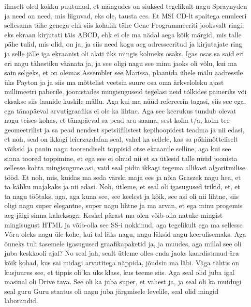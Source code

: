 ilmselt oled kokku puutunud, et mängudes on siuksed tegelikult nagu Spraynyden ja need on need, mis liiguvad, eks ole, tausta ees. Et MSI CD-lt spaitega emuleeri sellesama tähe genega ehk siis kohalik tähe Gene Programmeeriti jooksvalt ringi, eks ekraan kirjutati täis ABCD, ehk ei ole ma nädal aega kõik märgid, mis talle pähe tulid, mis olid, on ja, ja siis need kogu aeg adresseeritud ja kirjutajate ring ja selle jälle iga ekraanist oli alati üks mingis kolmeks osaks. Igas osas sa said eri eri nagu tähestiku väänata ja, ja see oligi nagu see minu jaoks oli võlu, kui ma sain selgeks, et on olemas Assembler see Marissa, plaanida ühele mälu aadressile üks Payton ja ja siis ma mõttelist veetsin suure osa oma ärkveloleku ajast millimeetri paberile, joonistades mingisuguseid tegelasi neid tõlkides paineriks või eksakse siis laanide kuskile mällu. Aga kui ma nüüd refereerin tagasi, siis see ega, ega tänapäeval arvutigraafika ei ole ka lihtne. Aga see keerukus tundub olevat nagu teises kohas, et tänapäeval sa pead aru saama, sest kolm t/a, kolm tee geomeetrilist ja sa pead nendest spetsiifilistest kepihoopidest teadma ja nii edasi, et noh, seal on ikkagi leierzazdafan seal, vahel ka sellele, kas sa põhimõtteliselt võiksid ja panin nagu toorendiselt toppisid otse ekraanile selline, aga kui see sinna toored toppimine, et ega see ei olnud nii et sa ütlesid talle nüüd joonista sellesse kohta mingisugune asi, vaid seal pidin ikkagi tegema allikast algoritmilise tööd. Et noh, mis, kuidas ma seda värski maja ees ja nõia Graszek nagu hea, et ta kähku majakaks ja nii edasi. Noh, ütleme, et seal oli igasugused trikid, et, et ta nagu töötaks, aga, aga kuna see, see keelest ja kõik, see asi oli nii lihtne, siis oligi nagu super elegantne, super nagu lihtne ja ma arvan, et ega minu progemis aeg jäigi sinna kaheksaga.
Keskel pärast ma olen võib-olla natuke mingist mingisugust HTML ja võib-olla see SS-i nokkinud, aga tegelikult ega ma sellesse Võru oleks nagu üle kohe, kui tal läks nagu, nagu läksid nagu keerulisemaks. Aga õnneks tuli tasemele igasugused graafikapaketid ja, ja muudes, aga millal see oli juba keskkooli ajal? No seal jah, sealt ütleme olles enda jaoks kaardistanud ära kõik kohad, kus sai midagi arvutitega näppida, jõudsin ma läbi. Väga tähtis on kusjuures see, et tippis oli ka üks klass, kus teeme siis. Aga seal olid juba igal masinal oli Drive tava. See oli ka juba super, et vahest ja, ja seal oli ka muidugi seal guru Guru staatus oli nagu juba järgmisele levelile, seal olid mingid laborandid.
